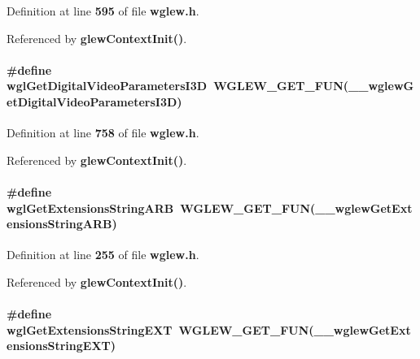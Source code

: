 Definition at line {\bf 595} of file {\bf wglew.\+h}.



Referenced by {\bf glew\+Context\+Init()}.

\paragraph[{wgl\+Get\+Digital\+Video\+Parameters\+I3D}]{\setlength{\rightskip}{0pt plus 5cm}\#define wgl\+Get\+Digital\+Video\+Parameters\+I3D~{\bf W\+G\+L\+E\+W\+\_\+\+G\+E\+T\+\_\+\+F\+UN}({\bf \+\_\+\+\_\+wglew\+Get\+Digital\+Video\+Parameters\+I3D})}\label{wglew_8h_a241a407b0c344107b153bdf2ec4c9cbb}


Definition at line {\bf 758} of file {\bf wglew.\+h}.



Referenced by {\bf glew\+Context\+Init()}.

\paragraph[{wgl\+Get\+Extensions\+String\+A\+RB}]{\setlength{\rightskip}{0pt plus 5cm}\#define wgl\+Get\+Extensions\+String\+A\+RB~{\bf W\+G\+L\+E\+W\+\_\+\+G\+E\+T\+\_\+\+F\+UN}({\bf \+\_\+\+\_\+wglew\+Get\+Extensions\+String\+A\+RB})}\label{wglew_8h_adee3b196f14083e02d4e6f8222fd3791}


Definition at line {\bf 255} of file {\bf wglew.\+h}.



Referenced by {\bf glew\+Context\+Init()}.

\paragraph[{wgl\+Get\+Extensions\+String\+E\+XT}]{\setlength{\rightskip}{0pt plus 5cm}\#define wgl\+Get\+Extensions\+String\+E\+XT~{\bf W\+G\+L\+E\+W\+\_\+\+G\+E\+T\+\_\+\+F\+UN}({\bf \+\_\+\+\_\+wglew\+Get\+Extensions\+String\+E\+XT})}\label{wglew_8h_a134614db3b57ba3660b3bc2e01b6c886}


